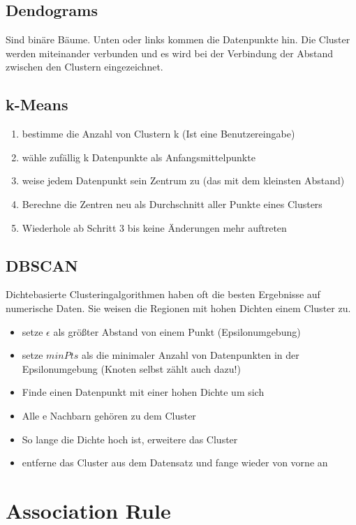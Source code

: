 \documentclass[a4paper]{scrartcl}
\begin{document}
\subsection{Dendograms}
Sind binäre Bäume. Unten oder links kommen die Datenpunkte hin. Die Cluster werden miteinander verbunden und es wird bei der Verbindung der Abstand zwischen den Clustern eingezeichnet. 

\subsection{k-Means}
\begin{enumerate}
\item bestimme die Anzahl von Clustern k (Ist eine Benutzereingabe)
\item wähle zufällig k Datenpunkte als Anfangsmittelpunkte
\item weise jedem Datenpunkt sein Zentrum zu (das mit dem kleinsten Abstand)
\item Berechne die Zentren neu als Durchschnitt aller Punkte eines Clusters
\item Wiederhole ab Schritt 3 bis keine Änderungen mehr auftreten
\end{enumerate}

\subsection{DBSCAN}
Dichtebasierte Clusteringalgorithmen haben oft die besten Ergebnisse auf numerische Daten. Sie weisen die Regionen mit hohen Dichten einem Cluster zu.
\begin{itemize}
\item setze $\epsilon$ als größter Abstand von einem Punkt (Epsilonumgebung)
\item setze $minPts$ als die minimaler Anzahl von Datenpunkten in der Epsilonumgebung (Knoten selbst zählt auch dazu!)
\item Finde einen Datenpunkt mit einer hohen Dichte um sich
\item Alle e Nachbarn gehören zu dem Cluster
\item So lange die Dichte hoch ist, erweitere das Cluster
\item entferne das Cluster aus dem Datensatz und fange wieder von vorne an
\end{itemize}

\section{Association Rule}
\end{document}
